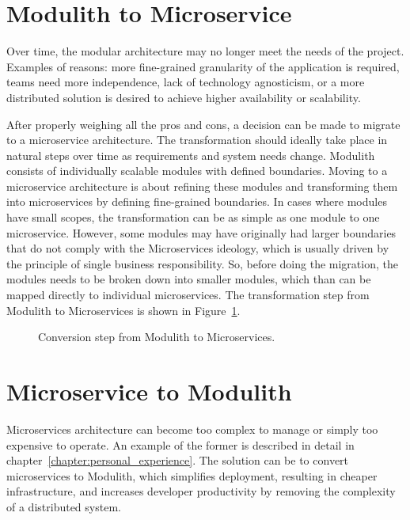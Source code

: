 \section{Modulith to Microservice}
\label{subsection:modulith_to_microservices}
Over time, the modular architecture may no longer meet the needs of the project. Examples of reasons: more fine-grained granularity of the application is required, teams need more independence, lack of technology agnosticism, or a more distributed solution is desired to achieve higher availability or scalability.

After properly weighing all the pros and cons, a decision can be made to migrate to a microservice architecture. The transformation should ideally take place in natural steps over time as requirements and system needs change. Modulith consists of individually scalable modules with defined boundaries. Moving to a microservice architecture is about refining these modules and transforming them into microservices by defining fine-grained boundaries. In cases where modules have small scopes, the transformation can be as simple as one module to one microservice. However, some modules may have originally had larger boundaries that do not comply with the Microservices ideology, which is usually driven by the principle of single business responsibility. So, before doing the migration, the modules needs to be broken down into smaller modules, which than can be mapped directly to individual microservices. The transformation step from Modulith to Microservices is shown in Figure~\ref{fig:modulith_to_microservices_steps}.

\begin{figure}
    \centering
    
    \caption{Conversion step from Modulith to Microservices.\label{fig:modulith_to_microservices_steps}}
\end{figure}


\section{Microservice to Modulith}
\label{subsection:microservices_to_modulith}
Microservices architecture can become too complex to manage or simply too expensive to operate. An example of the former is described in detail in chapter~\ref{chapter:personal_experience}. The solution can be to convert microservices to Modulith, which simplifies deployment, resulting in cheaper infrastructure, and increases developer productivity by removing the complexity of a distributed system.


